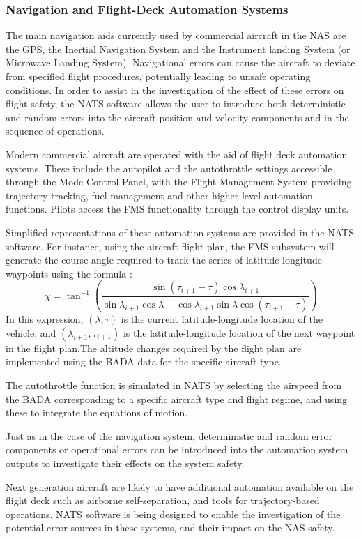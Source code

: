 \documentclass[11pt]{book}              %
\begin{document}
\subsubsection{Navigation and Flight-Deck Automation Systems}
The main navigation aids currently used by commercial aircraft in the NAS are the GPS, the Inertial Navigation System and the Instrument landing System (or Microwave Landing System). Navigational errors can cause the aircraft to deviate from specified flight procedures, potentially leading to unsafe operating conditions. In order to assist in the investigation of the effect of these errors on flight safety, the NATS software allows the user to introduce both deterministic and random errors into the aircraft position and velocity components and in the sequence of operations.\par
Modern commercial aircraft are operated with the aid of flight deck automation systems. These include the autopilot and the autothrottle settings accessible through the Mode Control Panel, with the Flight Management System providing trajectory tracking, fuel management and other higher-level automation functions. Pilots access the FMS functionality through the control display units.\par
Simplified representations of these automation systems are provided in the NATS software. For instance, using the aircraft flight plan, the FMS subsystem will generate the course angle required to track the series of latitude-longitude waypoints using the formula \cite{BilimoriaFACET2001}:
\begin{equation}
\chi= \tan^{-1}\left(\frac{\sin(\tau_{i+1}-\tau)\cos\lambda_{i+1}}{\sin\lambda_{i+1}\cos\lambda-\cos\lambda_{i+1}\sin\lambda\cos(\tau_{i+1} -\tau)}\right)
\end{equation}
In this expression, $(\lambda,\tau)$ is the current latitude-longitude location of the vehicle, and $(\lambda_{i+1},\tau_{i+1})$ is the latitude-longitude location of the next waypoint in the flight plan.The altitude changes required by the flight plan are implemented using the BADA data for the specific aircraft type.\par
The autothrottle function is simulated in NATS by selecting the airspeed from the BADA corresponding to a specific aircraft type and flight regime, and using these to integrate the equations of motion.\par
Just as in the case of the navigation system, deterministic and random error components or operational errors can be introduced into the automation system outputs to investigate their effects on the system safety.\par
Next generation aircraft are likely to have additional automation available on the flight deck such as airborne self-separation, and tools for trajectory-based operations. NATS software is being designed to enable the investigation of the potential error sources in these systems, and their impact on the NAS safety.
\end{document}

